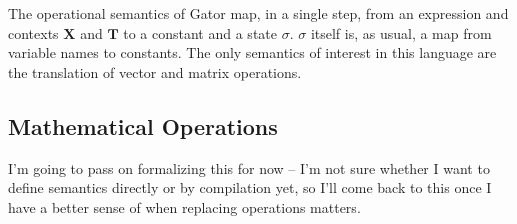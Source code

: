 \documentclass{article}
\newcommand{\Chi}{\mathbf{X}}
\newcommand{\Tau}{\mathbf{T}}
\begin{document}
The operational semantics of Gator map, in a single step, from an expression and contexts $\Chi$ and $\Tau$ to a constant and a state $\sigma$.  $\sigma$ itself is, as usual, a map from variable names to constants.
The only semantics of interest in this language are the translation of vector and matrix operations.
\subsection{Mathematical Operations}
I'm going to pass on formalizing this for now -- I'm not sure whether I want to define semantics directly or by compilation yet, so I'll come back to this once I have a better sense of when replacing operations matters.
\end{document}
